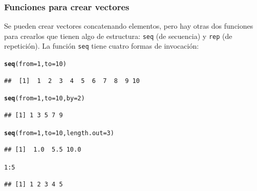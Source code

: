 \documentclass{config/apuntes}\usepackage[]{graphicx}\usepackage[]{xcolor}
\makeatletter
\newcommand{\hlnum}[1]{\textcolor[rgb]{0.686,0.059,0.569}{#1}}%
\newcommand{\hlopt}[1]{\textcolor[rgb]{0,0,0}{#1}}%
\newcommand{\hldef}[1]{\textcolor[rgb]{0.345,0.345,0.345}{#1}}%
\newcommand{\hlkwc}[1]{\textcolor[rgb]{0.333,0.667,0.333}{#1}}%
\newcommand{\hlkwd}[1]{\textcolor[rgb]{0.737,0.353,0.396}{\textbf{#1}}}%
\newenvironment{kframe}{%
 \def\at@end@of@kframe{}%
 \ifinner\ifhmode%
  \def\at@end@of@kframe{\end{minipage}}%
  \begin{minipage}{\columnwidth}%
 \fi\fi%
 \def\FrameCommand##1{\hskip\@totalleftmargin \hskip-\fboxsep
 \colorbox{shadecolor}{##1}\hskip-\fboxsep
     \hskip-\linewidth \hskip-\@totalleftmargin \hskip\columnwidth}%
 \MakeFramed {\advance\hsize-\width
   \@totalleftmargin\z@ \linewidth\hsize
   \@setminipage}}%
 {\par\unskip\endMakeFramed%
 \at@end@of@kframe}
\newenvironment{knitrout}{}{} %
\newcommand{\code}[1]{\texttt{#1}}
\makeatother
\begin{document}
\subsubsection{Funciones para crear vectores}
Se pueden crear vectores concatenando elementos, pero hay otras dos funciones para crearlos que tienen algo de estructura: \code{seq} (de secuencia) y \code{rep} (de repetición). La función \code{seq} tiene cuatro formas de invocación:
\begin{knitrout}
\color{fgcolor}\begin{kframe}
\begin{alltt}
\hlkwd{seq}\hldef{(}\hlkwc{from} \hldef{=} \hlnum{1}\hldef{,} \hlkwc{to} \hldef{=} \hlnum{10}\hldef{)}
\end{alltt}
\begin{verbatim}
##  [1]  1  2  3  4  5  6  7  8  9 10
\end{verbatim}
\begin{alltt}
\hlkwd{seq}\hldef{(}\hlkwc{from} \hldef{=} \hlnum{1}\hldef{,} \hlkwc{to} \hldef{=} \hlnum{10}\hldef{,} \hlkwc{by} \hldef{=} \hlnum{2}\hldef{)}
\end{alltt}
\begin{verbatim}
## [1] 1 3 5 7 9
\end{verbatim}
\begin{alltt}
\hlkwd{seq}\hldef{(}\hlkwc{from} \hldef{=} \hlnum{1}\hldef{,} \hlkwc{to} \hldef{=} \hlnum{10}\hldef{,} \hlkwc{length.out} \hldef{=} \hlnum{3}\hldef{)}
\end{alltt}
\begin{verbatim}
## [1]  1.0  5.5 10.0
\end{verbatim}
\begin{alltt}
\hlnum{1}\hlopt{:}\hlnum{5}
\end{alltt}
\begin{verbatim}
## [1] 1 2 3 4 5
\end{verbatim}
\end{kframe}
\end{knitrout}
\end{document}
